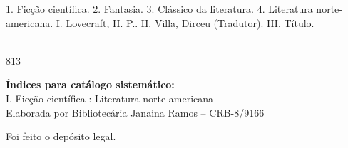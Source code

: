 {\hspace{20pt}\parbox{190pt}{1. Ficção científica. 2. Fantasia. 3. Clássico da literatura. 4. Literatura norte-americana. I. Lovecraft, H. P.. II. Villa, Dirceu (Tradutor). III. Título.}\\[6pt]

\hspace{188pt} 813\\

\hrulefill

\noindent{}\textbf{Índices para catálogo sistemático:}\\
\noindent{}I. Ficção científica : Literatura norte-americana\\[6pt]
\noindent{}Elaborada por Bibliotecária Janaina Ramos – CRB-8/9166

%
\bigskip
Foi feito o depósito legal.\\\endgroup
\pagebreak\raggedleft
\titulagem

{\Large \autor \par\vspace{1.5ex}}
\vspace{8.5mm}

}
